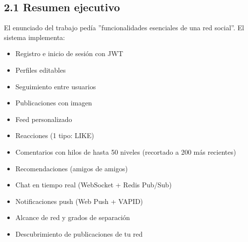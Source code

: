 \documentclass[10pt,a4paper]{article}
\begin{document}
\subsection{2.1 Resumen ejecutivo}
El enunciado del trabajo pedía ''funcionalidades esenciales de una red social''. El sistema implementa:\par\vspace{0.4em}
\begin{itemize}[leftmargin=1.5em,noitemsep,topsep=0pt]\item Registro e inicio de sesión con JWT\end{itemize}
\begin{itemize}[leftmargin=1.5em,noitemsep,topsep=0pt]\item Perfiles editables\end{itemize}
\begin{itemize}[leftmargin=1.5em,noitemsep,topsep=0pt]\item Seguimiento entre usuarios\end{itemize}
\begin{itemize}[leftmargin=1.5em,noitemsep,topsep=0pt]\item Publicaciones con imagen\end{itemize}
\begin{itemize}[leftmargin=1.5em,noitemsep,topsep=0pt]\item Feed personalizado\end{itemize}
\begin{itemize}[leftmargin=1.5em,noitemsep,topsep=0pt]\item Reacciones (1 tipo: LIKE)\end{itemize}
\begin{itemize}[leftmargin=1.5em,noitemsep,topsep=0pt]\item Comentarios con hilos de hasta 50 niveles (recortado a 200 más recientes)\end{itemize}
\begin{itemize}[leftmargin=1.5em,noitemsep,topsep=0pt]\item Recomendaciones (amigos de amigos)\end{itemize}
\begin{itemize}[leftmargin=1.5em,noitemsep,topsep=0pt]\item Chat en tiempo real (WebSocket + Redis Pub/Sub)\end{itemize}
\begin{itemize}[leftmargin=1.5em,noitemsep,topsep=0pt]\item Notificaciones push (Web Push + VAPID)\end{itemize}
\begin{itemize}[leftmargin=1.5em,noitemsep,topsep=0pt]\item Alcance de red y grados de separación\end{itemize}
\begin{itemize}[leftmargin=1.5em,noitemsep,topsep=0pt]\item Descubrimiento de publicaciones de tu red\end{itemize}
\end{document}
